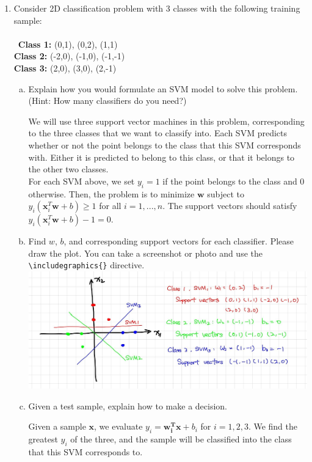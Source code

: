 \documentclass[11pt]{article}
\renewcommand{\vec}[1]{\mathbf{#1}}
\begin{document}
\begin{enumerate}

\item Consider 2D classification problem with 3 classes with the following training sample:\\\\\
\textbf{Class 1:} (0,1), (0,2), (1,1)\\
\textbf{Class 2:} (-2,0), (-1,0), (-1,-1)\\
\textbf{Class 3:} (2,0), (3,0), (2,-1)\\
\begin{enumerate}[(a)]
    \item 
    Explain how you would formulate an SVM model to solve this problem. (Hint: How many classifiers do you need?)\\

\begin{answertext}{5cm}{}  

We will use three support vector machines in this problem, corresponding to the three classes that we want to classify into. Each SVM predicts whether or not the point belongs to the class that this SVM corresponds with. Either it is predicted to belong to this class, or that it belongs to the other two classes.\\
For each SVM above, we set $y_i = 1$ if the point belongs to the class and 0 otherwise. Then, the problem is to minimize $\vec w$ subject to $y_i(\vec x_i^T\vec w + b) \geq 1$ for all $i = 1,...,n$. The support vectors should satisfy $y_i(\vec x_i^T\vec w + b) - 1 = 0$.

\end{answertext} 
    \item
    Find $w$, $b$, and corresponding support vectors for each classifier. Please draw the plot.  You can take a screenshot or photo and use the \texttt{{\textbackslash}includegraphics\{\}} directive.\\
\includegraphics[scale=0.25]{p2.2.jpg}
    \item
    Given a test sample, explain how to make a decision.\\

\begin{answertext}{5cm}{}

Given a sample $\vec{x}$, we evaluate $y_{i} = \vec{w_{i}^T}\vec{x} + b_{i}$ for $i = 1, 2, 3$. We find the greatest $y_{i}$ of the three, and the sample will be classified into the class that this SVM corresponds to.

\end{answertext} 
\end{enumerate}

\end{enumerate}
\end{document}
